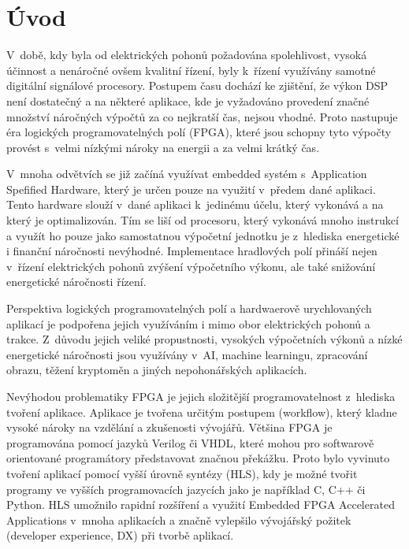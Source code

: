 \documentclass[a4paper, twoside, 11pt]{article}
\begin{document}
\null\newpage
\null\newpage %
\setcounter{page}{1}

\section{Úvod}
V~době, kdy byla od elektrických pohonů požadována spolehlivost, vysoká účinnost a nenáročné ovšem kvalitní řízení, byly k~řízení využívány samotné digitální signálové procesory. Postupem času dochází ke zjištění, že výkon DSP není dostatečný a na některé aplikace, kde je vyžadováno provedení značné množství náročných výpočtů za co nejkratší čas, nejsou vhodné. Proto nastupuje éra logických programovatelných polí (FPGA), které jsou schopny tyto výpočty provést s~velmi nízkými nároky na energii a za velmi krátký čas.\par
V~mnoha odvětvích se již začíná využívat embedded systém s~Application Spefified Hardware, který je určen pouze na využití v~předem dané aplikaci. Tento hardware slouží v~dané aplikaci k~jedinému účelu, který vykonává a na který je optimalizován. Tím se liší od procesoru, který vykonává mnoho instrukcí a využít ho pouze jako samostatnou výpočetní jednotku je z~hlediska energetické i finanční náročnosti nevýhodné. Implementace hradlových polí přináší nejen v~řízení elektrických pohonů zvýšení výpočetního výkonu, ale také snižování energetické náročnosti řízení.\par
Perspektiva logických programovatelných polí a hardwaerově urychlovaných aplikací je podpořena jejich využíváním i mimo obor elektrických pohonů a trakce. Z~důvodu jejich veliké propustnosti, vysokých výpočetních výkonů a nízké energetické náročnosti jsou využívány v~AI, machine learningu, zpracování obrazu, těžení kryptoměn a jiných nepohonářských aplikacích.\par
Nevýhodou problematiky FPGA je jejich složitější programovatelnost z~hlediska tvoření aplikace. Aplikace je tvořena určitým postupem (workflow), který kladne vysoké nároky na vzdělání a zkušenosti vývojářů. Většina FPGA je programována pomocí jazyků Verilog či VHDL, které mohou pro softwarově orientované programátory představovat značnou překážku. Proto bylo vyvinuto tvoření aplikací pomocí vyšší úrovně syntézy (HLS), kdy je možné tvořit programy ve vyšších programovacích jazycích jako je například C, C++ či Python. HLS umožnilo rapidní rozšíření a využití Embedded FPGA Accelerated Applications v~mnoha aplikacích a značně vylepšilo vývojářský požitek (developer experience, DX) při tvorbě aplikací.\par
\end{document}
